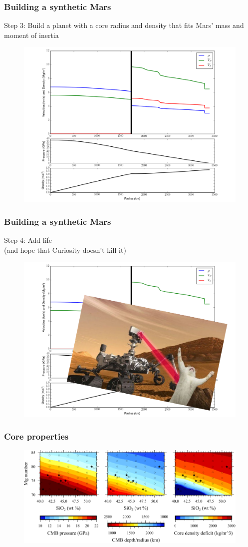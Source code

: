 \documentclass[compress,framenumber]{beamer}
\begin{document}
\begin{frame}
  \frametitle{Building a synthetic Mars}
  Step 3: Build a planet with a core radius and density that fits
  Mars' mass and moment of inertia
  \vspace{-0.5em}
  \begin{figure}
    \includegraphics[width=0.7\linewidth]{figures/example_profile.pdf}
  \end{figure}
\end{frame}

\begin{frame}
  \frametitle{Building a synthetic Mars}
  Step 4: Add life \\(and hope that Curiosity doesn't kill it)
  \vspace{-0.5em}
  \begin{figure}
    \includegraphics[width=0.7\linewidth]{figures/example_profile_with_life.pdf}
  \end{figure}
\end{frame}

\begin{frame}
  \frametitle{Core properties}
  \vspace{-1.em}
  \begin{figure}
    \includegraphics[width=0.95\linewidth]{figures/cmb_pressures_1673.pdf}
  \end{figure}
\end{frame}
\end{document}
